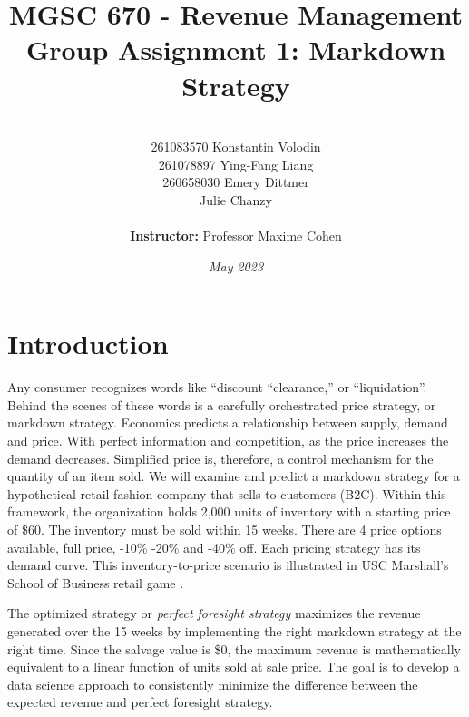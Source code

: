 \documentclass[11pt,a4paper]{article}
\title{
\hfill \break
\hfill \break
\hfill \break
\textbf{\large MGSC 670 - Revenue Management}\\
Group Assignment 1: Markdown Strategy\\
\hfill \break
\hfill \break
}
\author{\\
261083570 Konstantin Volodin\\
261078897 Ying-Fang Liang\\
260658030 Emery Dittmer\\
Julie Chanzy\\\\
\textbf{Instructor:} Professor Maxime Cohen\\
\hfill \break}
\date{\emph{May 2023}}
\begin{document}
\maketitle
\thispagestyle{empty}
\pagebreak

\tableofcontents
{}
\pagebreak

\setcounter{page}{1}
\section{Introduction}
Any consumer recognizes words like “discount “clearance,” or “liquidation”. Behind the scenes of these words is a carefully orchestrated price strategy, or markdown strategy. 
Economics predicts a relationship between supply, demand and price. With perfect information and competition, as the price increases the demand decreases. 
Simplified price is, therefore, a control mechanism for the quantity of an item sold. 
We will examine and predict a markdown strategy for a hypothetical retail fashion company that sells to customers (B2C). 
Within this framework, the organization holds 2,000 units of inventory with a starting price of \$60. 
The inventory must be sold within 15 weeks. There are 4 price options available, full price, -10\% -20\% and -40\% off. 
Each pricing strategy has its demand curve. This inventory-to-price scenario is illustrated in USC Marshall’s School of Business retail game \cite{RetailerGame}. 

The optimized strategy or \emph{perfect foresight strategy} maximizes the revenue generated over the 15 weeks by implementing the right markdown strategy at the right time. Since the salvage value is \$0, the maximum revenue is mathematically equivalent to a linear function of units sold at sale price. The goal is to develop a data science approach to consistently minimize the difference between the expected revenue and perfect foresight strategy.  
\end{document}
